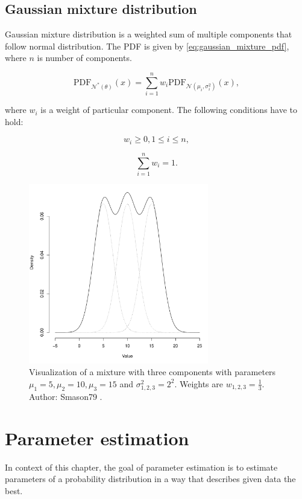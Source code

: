 \documentclass[thesis=B,english]{FITthesis}[2012/06/26]
\begin{document}
\section{Gaussian mixture distribution}

Gaussian mixture distribution is a weighted sum of multiple components that follow normal distribution. The PDF is given by \ref{eq:gaussian_mixture_pdf}, where $n$ is number of components.

\begin{equation} \label{eq:gaussian_mixture_pdf}
\text{PDF}_{\mathcal{N}^*(\theta)}(x) = \sum_{i=1}^n w_i \text{PDF}_{\mathcal{N}(\mu_i,\sigma^2_i)}(x),
\end{equation}

where $w_i$ is a weight of particular component. The following conditions have to hold:

\begin{equation}
w_i \geq 0, 1 \leq i \leq n,
\end{equation}

\begin{equation}
\sum_{i=1}^n w_i = 1.
\end{equation}

\begin{figure}
	\centering
 	\includegraphics[width=0.7\textwidth]{gaussian_mixture}
 	\caption{Visualization of a mixture with three components with parameters $\mu_1=5, \mu_2=10, \mu_3=15$ and $\sigma_{1,2,3}^2=2^2$. Weights are $w_{1,2,3} = \frac{1}{3}$. Author: Smason79 \cite{gaussian-mixture}.}
 	\label{fig:gaussian_mixture}
\end{figure}

\chapter{Parameter estimation}
\label{parameter-estimation-chapter}
In context of this chapter, the goal of parameter estimation is to estimate parameters of a probability distribution in a way that describes given data the best.
\end{document}
